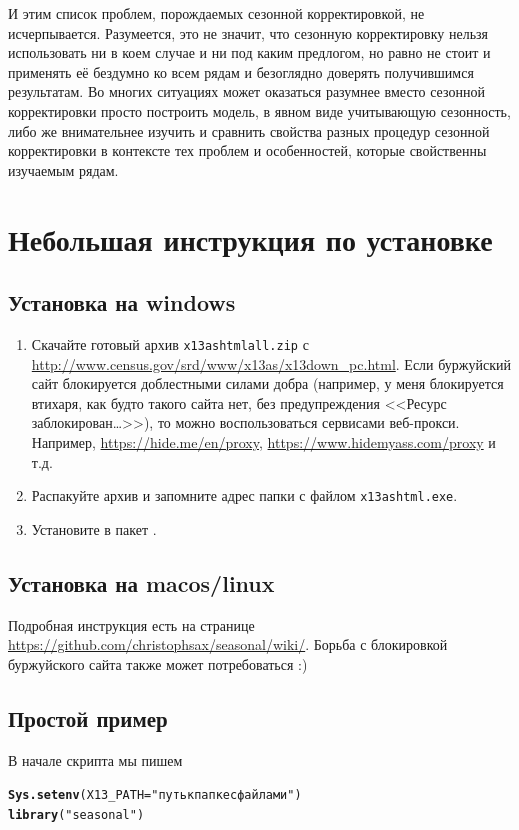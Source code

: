\documentclass[final,pdftex]{../../template/epsilonj}\usepackage[]{graphicx}\usepackage[]{color}
\makeatletter
\newcommand{\hlstr}[1]{\textcolor[rgb]{0.192,0.494,0.8}{#1}}%
\newcommand{\hlstd}[1]{\textcolor[rgb]{0.345,0.345,0.345}{#1}}%
\newcommand{\hlkwc}[1]{\textcolor[rgb]{0.333,0.667,0.333}{#1}}%
\newcommand{\hlkwd}[1]{\textcolor[rgb]{0.737,0.353,0.396}{\textbf{#1}}}%
\newenvironment{kframe}{%
 \def\at@end@of@kframe{}%
 \ifinner\ifhmode%
  \def\at@end@of@kframe{\end{minipage}}%
  \begin{minipage}{\columnwidth}%
 \fi\fi%
 \def\FrameCommand##1{\hskip\@totalleftmargin \hskip-\fboxsep
 \colorbox{shadecolor}{##1}\hskip-\fboxsep
     \hskip-\linewidth \hskip-\@totalleftmargin \hskip\columnwidth}%
 \MakeFramed {\advance\hsize-\width
   \@totalleftmargin\z@ \linewidth\hsize
   \@setminipage}}%
 {\par\unskip\endMakeFramed%
 \at@end@of@kframe}
\newenvironment{knitrout}{}{} %
\makeatother
\begin{document}
И этим список проблем, порождаемых сезонной корректировкой, не исчерпывается. Разумеется, это не значит, что сезонную корректировку нельзя использовать ни в коем случае и ни под каким предлогом, но равно не стоит и применять её бездумно ко всем рядам и безоглядно доверять получившимся результатам. Во многих ситуациях может оказаться разумнее вместо сезонной корректировки просто построить модель, в явном виде учитывающую сезонность, либо же внимательнее изучить и сравнить свойства разных процедур сезонной корректировки в контексте тех проблем и особенностей, которые свойственны изучаемым рядам. 

\section{Небольшая инструкция по установке}


\subsection{Установка на windows}

\begin{enumerate}
\item Скачайте готовый архив \verb|x13ashtmlall.zip| с \url{http://www.census.gov/srd/www/x13as/x13down_pc.html}. Если буржуйский сайт блокируется доблестными силами добра (например, у меня блокируется втихаря, как будто такого сайта нет, без предупреждения <<Ресурс заблокирован\ldots>>), то можно воспользоваться сервисами веб-прокси. Например, \url{https://hide.me/en/proxy}, \url{https://www.hidemyass.com/proxy} и т.д.
\item Распакуйте архив и запомните адрес папки с файлом \verb|x13ashtml.exe|.
\item Установите в   пакет .
\end{enumerate}

\subsection{Установка на macos/linux}

Подробная инструкция есть на странице \url{https://github.com/christophsax/seasonal/wiki/}. Борьба с блокировкой буржуйского сайта также может потребоваться :)


\subsection{Простой пример}
В начале скрипта   мы пишем
\begin{knitrout}
\color{fgcolor}\begin{kframe}
\begin{alltt}
\hlkwd{Sys.setenv}\hlstd{(}\hlkwc{X13_PATH} \hlstd{=}\hlstr{"путь к папке с файлами"}\hlstd{)}
\hlkwd{library}\hlstd{(}\hlstr{"seasonal"}\hlstd{)}
\end{alltt}
\end{kframe}
\end{knitrout}
\end{document}

